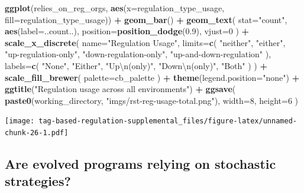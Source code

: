 \documentclass[]{book}
\newenvironment{Shaded}{\begin{snugshade}}{\end{snugshade}}
\newcommand{\CharTok}[1]{\textcolor[rgb]{0.31,0.60,0.02}{#1}}
\newcommand{\DataTypeTok}[1]{\textcolor[rgb]{0.13,0.29,0.53}{#1}}
\newcommand{\DecValTok}[1]{\textcolor[rgb]{0.00,0.00,0.81}{#1}}
\newcommand{\FloatTok}[1]{\textcolor[rgb]{0.00,0.00,0.81}{#1}}
\newcommand{\KeywordTok}[1]{\textcolor[rgb]{0.13,0.29,0.53}{\textbf{#1}}}
\newcommand{\NormalTok}[1]{#1}
\newcommand{\OperatorTok}[1]{\textcolor[rgb]{0.81,0.36,0.00}{\textbf{#1}}}
\newcommand{\StringTok}[1]{\textcolor[rgb]{0.31,0.60,0.02}{#1}}
\begin{document}
\begin{Shaded}
\begin{Highlighting}[]
\KeywordTok{ggplot}\NormalTok{(relies_on_reg_orgs, }\KeywordTok{aes}\NormalTok{(}\DataTypeTok{x=}\NormalTok{regulation_type_usage, }\DataTypeTok{fill=}\NormalTok{regulation_type_usage)) }\OperatorTok{+}
\StringTok{  }\KeywordTok{geom_bar}\NormalTok{() }\OperatorTok{+}
\StringTok{  }\KeywordTok{geom_text}\NormalTok{(}
    \DataTypeTok{stat=}\StringTok{"count"}\NormalTok{,}
    \KeywordTok{aes}\NormalTok{(}\DataTypeTok{label=}\NormalTok{..count..),}
    \DataTypeTok{position=}\KeywordTok{position_dodge}\NormalTok{(}\FloatTok{0.9}\NormalTok{),}
    \DataTypeTok{vjust=}\DecValTok{0}
\NormalTok{  ) }\OperatorTok{+}
\StringTok{  }\KeywordTok{scale_x_discrete}\NormalTok{(}
    \DataTypeTok{name=}\StringTok{"Regulation Usage"}\NormalTok{,}
    \DataTypeTok{limits=}\KeywordTok{c}\NormalTok{(}
      \StringTok{"neither"}\NormalTok{,}
      \StringTok{"either"}\NormalTok{,}
      \StringTok{"up-regulation-only"}\NormalTok{,}
      \StringTok{"down-regulation-only"}\NormalTok{,}
      \StringTok{"up-and-down-regulation"}
\NormalTok{    ),}
    \DataTypeTok{labels=}\KeywordTok{c}\NormalTok{(}
      \StringTok{"None"}\NormalTok{,}
      \StringTok{"Either"}\NormalTok{,}
      \StringTok{"Up}\CharTok{\textbackslash{}n}\StringTok{(only)"}\NormalTok{,}
      \StringTok{"Down}\CharTok{\textbackslash{}n}\StringTok{(only)"}\NormalTok{,}
      \StringTok{"Both"}
\NormalTok{    )}
\NormalTok{  ) }\OperatorTok{+}
\StringTok{  }\KeywordTok{scale_fill_brewer}\NormalTok{(}
    \DataTypeTok{palette=}\NormalTok{cb_palette}
\NormalTok{  ) }\OperatorTok{+}
\StringTok{  }\KeywordTok{theme}\NormalTok{(}\DataTypeTok{legend.position=}\StringTok{"none"}\NormalTok{) }\OperatorTok{+}
\StringTok{  }\KeywordTok{ggtitle}\NormalTok{(}\StringTok{"Regulation usage across all environments"}\NormalTok{) }\OperatorTok{+}
\StringTok{  }\KeywordTok{ggsave}\NormalTok{(}
    \KeywordTok{paste0}\NormalTok{(working_directory, }\StringTok{"imgs/rst-reg-usage-total.png"}\NormalTok{),}
    \DataTypeTok{width=}\DecValTok{8}\NormalTok{,}
    \DataTypeTok{height=}\DecValTok{6}
\NormalTok{  )}
\end{Highlighting}
\end{Shaded}

\texttt{[image: tag-based-regulation-supplemental\_files/figure-latex/unnamed-chunk-26-1.pdf]}

\hypertarget{are-evolved-programs-relying-on-stochastic-strategies}{%
\subsection{Are evolved programs relying on stochastic strategies?}\label{are-evolved-programs-relying-on-stochastic-strategies}}
\end{document}
